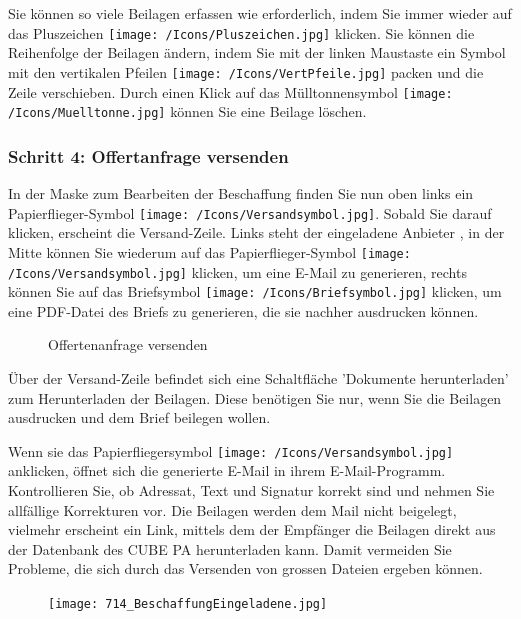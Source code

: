Sie können so viele Beilagen erfassen wie erforderlich, indem Sie immer wieder auf das Pluszeichen \texttt{[image: /Icons/Pluszeichen.jpg]}  klicken. Sie können die Reihenfolge der Beilagen ändern, indem Sie mit der linken Maustaste ein Symbol mit den vertikalen Pfeilen \texttt{[image: /Icons/VertPfeile.jpg]}  packen und die Zeile verschieben. Durch einen Klick auf das Mülltonnensymbol \texttt{[image: /Icons/Muelltonne.jpg]}  können Sie eine Beilage löschen.

\subsubsection{Schritt 4: Offertanfrage versenden}

In der Maske zum Bearbeiten der Beschaffung finden Sie nun oben links ein Papierflieger-Symbol \texttt{[image: /Icons/Versandsymbol.jpg]}. Sobald Sie darauf klicken, erscheint die Versand-Zeile. Links steht der eingeladene Anbieter , in der Mitte können Sie wiederum auf das Papierflieger-Symbol \texttt{[image: /Icons/Versandsymbol.jpg]}  klicken, um eine E-Mail zu generieren, rechts können Sie auf das Briefsymbol \texttt{[image: /Icons/Briefsymbol.jpg]}  klicken, um eine PDF-Datei des Briefs zu generieren, die sie nachher ausdrucken können.

\begin{figure}[H]
\caption{Offertenanfrage versenden}
\end{figure}

Über der Versand-Zeile befindet sich eine Schaltfläche 'Dokumente herunterladen'  zum Herunterladen der Beilagen. Diese benötigen Sie nur, wenn Sie die Beilagen ausdrucken und dem Brief beilegen wollen.

\vspace{\baselineskip}

Wenn sie das Papierfliegersymbol \texttt{[image: /Icons/Versandsymbol.jpg]} anklicken, öffnet sich die generierte E-Mail in ihrem E-Mail-Programm. Kontrollieren Sie, ob Adressat, Text und Signatur korrekt sind und nehmen Sie allfällige Korrekturen vor. Die Beilagen werden dem Mail nicht beigelegt, vielmehr erscheint ein Link, mittels dem der Empfänger die Beilagen direkt aus der Datenbank des CUBE PA herunterladen kann. Damit vermeiden Sie Probleme, die sich durch das Versenden von grossen Dateien ergeben können.

\begin{figure}
\vspace{-15pt}
\texttt{[image: 714\_BeschaffungEingeladene.jpg]}
\end{figure}


